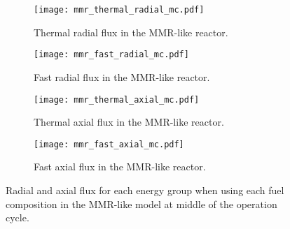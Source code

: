    
\begin{figure}
        \centering
        \begin{subfigure}[b]{0.48\textwidth}
            \centering
            \texttt{[image: mmr\_thermal\_radial\_mc.pdf]}
            \caption{Thermal radial flux in the \gls{MMR}-like reactor.}
            \label{fig:mmr_thermal_radial_mc}
        \end{subfigure}
        \hfill
        \begin{subfigure}[b]{0.48\textwidth}
            \centering
            \texttt{[image: mmr\_fast\_radial\_mc.pdf]}
            \caption{Fast radial flux in the \gls{MMR}-like reactor.}
            \label{fig:mmr_fast_radial_mc}
        \end{subfigure}
        \hfill
            
        \begin{subfigure}[b]{0.48\textwidth}
            \centering
            \texttt{[image: mmr\_thermal\_axial\_mc.pdf]}
            \caption{Thermal axial flux in the \gls{MMR}-like reactor. }
            \label{fig:mmr_thermal_axial_mc}
        \end{subfigure}
        \hfill
        \begin{subfigure}[b]{0.48\textwidth}
            \centering
            \texttt{[image: mmr\_fast\_axial\_mc.pdf]}
            \caption{Fast axial flux in the \gls{MMR}-like reactor.}
            \label{fig:mmr_fast_axial_mc}
        \end{subfigure}
        \hfill
        \caption{Radial and axial flux for each energy group when using 
        each fuel composition in the \gls{MMR}-like model at middle of 
        the operation cycle.}
        \label{fig:mmr_mc}
   \end{figure}

